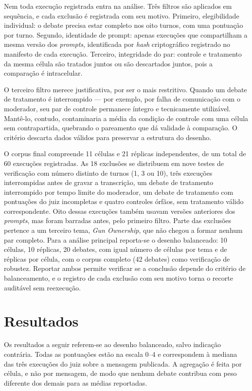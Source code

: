 \documentclass[conference]{IEEEtran} \IEEEoverridecommandlockouts %
\begin{document}
Nem toda execução registrada entra na análise. Três filtros são aplicados em
sequência, e cada exclusão é registrada com seu motivo. Primeiro,
elegibilidade individual: o debate precisa estar completo nos oito
turnos, com uma pontuação por turno. Segundo, identidade de prompt:
apenas execuções que compartilham a mesma versão dos \textit{prompts}, identificada por
\textit{hash} criptográfico registrado no manifesto de cada execução. Terceiro,
integridade do par: controle e tratamento da mesma célula são tratados
juntos ou são descartados juntos, pois a comparação é intracelular.

O terceiro filtro merece justificativa, por ser o mais restritivo. Quando um
debate de tratamento é interrompido — por exemplo, por falha de comunicação com
o moderador, seu par de controle permanece íntegro e tecnicamente utilizável.
Mantê-lo, contudo, contaminaria a média da condição de controle com uma célula
sem contrapartida, quebrando o pareamento que dá validade à comparação. O
critério descarta dados válidos para preservar a estrutura do desenho.

O corpus final compreende 11 células e 21 réplicas independentes, de um total
de 60 execuções registradas. As 18 exclusões se distribuem em nove testes de
verificação com número distinto de turnos (1, 3 ou 10), três execuções
interrompidas antes de gravar a transcrição, um debate de tratamento
interrompido por tempo limite do moderador, um debate de tratamento com
pontuações do juiz incompletas e quatro controles órfãos, sem tratamento válido
correspondente. Oito dessas execuções também usavam versões anteriores dos
\textit{prompts}, mas foram barradas antes, pelo primeiro filtro. Parte das
exclusões pertence a um terceiro tema, \textit{Gun Ownership}, que não chegou a
formar nenhum par completo. Para a análise principal reporta-se o desenho
balanceado: 10 células, 10 réplicas, 20 debates, com igual número de células por tema e de réplicas por célula, com o corpus completo (42 debates) como
verificação de robustez. Reportar ambos permite verificar se a conclusão depende
do critério de balanceamento, e o registro de cada exclusão com seu motivo
torna o recorte auditável sem reexecução.

\section{Resultados}

Os resultados a seguir referem-se ao desenho balanceado, salvo indicação
contrária. Todas as pontuações estão na escala 0--4 e correspondem à mediana
das três execuções do juiz sobre a mensagem publicada. A agregação é feita por
célula, e não por mensagem, de modo que nenhum debate contribua com peso
diferente dos demais para as médias reportadas.
\end{document}
